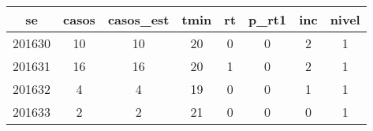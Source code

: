 \begin{tabular}{c|ccccccc}
  \hline
se & casos & casos\_est & tmin & rt & p\_rt1 & inc & nivel \\ 
  \hline
201630 & 10 & 10 & 20 & 0 & 0 & 2 & 1 \\ 
  201631 & 16 & 16 & 20 & 1 & 0 & 2 & 1 \\ 
  201632 & 4 & 4 & 19 & 0 & 0 & 1 & 1 \\ 
  201633 & 2 & 2 & 21 & 0 & 0 & 0 & 1 \\ 
   \hline
\end{tabular}
